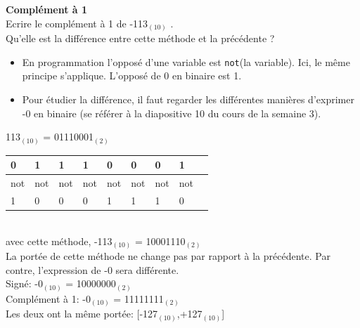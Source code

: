 \begin{Exercice}[5 minutes] \textbf{Complément à 1}\\
    Ecrire le complément à 1 de -113$_{(10)}$ . \\

	Qu'elle est la différence entre cette méthode et la précédente ? \\

    \begin{conseil}
        \begin{itemize}
        	\item En programmation l'opposé d'une variable est \lstinline{not}(la variable). Ici, le même principe s'applique. L'opposé de 0 en binaire est 1.
        	\item Pour étudier la différence, il faut regarder les différentes manières d'exprimer -0 en binaire (se référer à la diapositive 10 du cours de la semaine 3).
        \end{itemize} 
    \end{conseil}
    
    \begin{solution}
    	113$_{(10)}$ = 01110001$_{(2)}$ \\
    	
        \begin{tabular}{| p{1cm} | p{1cm} | p{1cm} | p{1cm} | p{1cm} | p{1cm} | p{1cm} | p{1cm} | p{1cm} |} 
            \hline
            0 & 1 & 1 & 1 & 0 & 0 & 0 & 1 \\ [0.5ex] 
            \hline
            not & not & not & not & not & not & not & not \\ [0.5ex]
            \hline
            1 & 0 & 0 & 0 & 1 & 1 & 1 & 0 \\ [0.5ex]
            \hline
        \end{tabular} \\
        
        avec cette méthode, -113$_{(10)}$ = 10001110$_{(2)}$ \\
        
        La portée de cette méthode ne change pas par rapport à la précédente. Par contre, l'expression de -0 sera différente.\\
        
        Signé: -0$_{(10)}$ = 10000000$_{(2)}$ \\
        
        Complément à 1: -0$_{(10)}$ = 11111111$_{(2)}$ \\
        
        Les deux ont la même portée: [-127$_{(10)}$,+127$_{(10)}$] \\
        
    \end{solution}
\end{Exercice}

